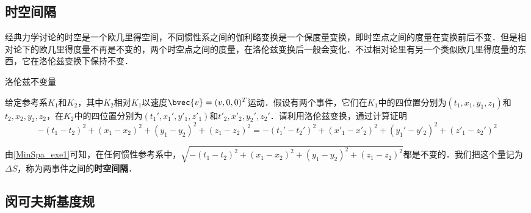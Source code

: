 
\subsection{时空间隔}
经典力学讨论的时空是一个欧几里得空间，不同惯性系之间的伽利略变换是一个保度量变换，即时空点之间的度量在变换前后不变．但是相对论下的欧几里得度量不再是不变的，两个时空点之间的度量，在洛伦兹变换后一般会变化．不过相对论里有另一个类似欧几里得度量的东西，它在洛伦兹变换下保持不变．

\begin{exercise}{洛伦兹不变量}\label{MinSpa_exe1}

给定参考系$K_1$和$K_2$，其中$K_2$相对$K_1$以速度$\bvec{v}=(v,0,0)^T$运动．假设有两个事件，它们在$K_1$中的四位置分别为$(t_1, x_1, y_1, z_1)$和$t_2, x_2, y_2, z_2$，在$K_2$中的四位置分别为$(t_1', x_1', y'_1, z'_1)$和$t'_2, x'_2, y_2', z_2'$．请利用洛伦兹变换，通过计算证明
\begin{equation}
-(t_1-t_2)^2+(x_1-x_2)^2+(y_1-y_2)^2+(z_1-z_2)^2=-(t_1'-t_2')^2+(x'_1-x'_2)^2+(y_1'-y'_2)^2+(z'_1-z_2')^2
\end{equation}
\end{exercise}

由\autoref{MinSpa_exe1}可知，在任何惯性参考系中，$\sqrt{-(t_1-t_2)^2+(x_1-x_2)^2+(y_1-y_2)^2+(z_1-z_2)^2}$都是不变的．我们把这个量记为$\Delta S$，称为两事件之间的\textbf{时空间隔}．

\subsection{闵可夫斯基度规}

